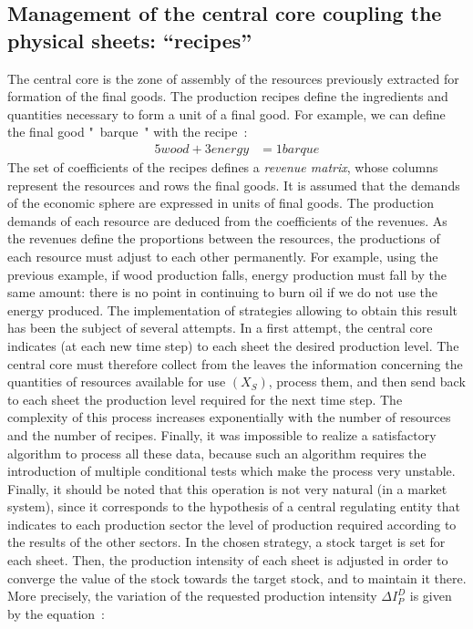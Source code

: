\documentclass[12pt,a4paper]{article}%
\begin{document}
\begin{appendix}
\section{Management of the central core coupling the physical sheets: ``recipes''}   
The central core is the zone of assembly of the resources previously extracted for formation of the final goods. The production recipes define the ingredients and quantities necessary to form a unit of a final good. For example, we can define the final good "~barque~" with the recipe~: 
\begin{align}
	5 wood + 3 energy &= 1 barque 
\end{align} 
The set of coefficients of the recipes defines a \textit{revenue matrix}, whose columns represent the resources and rows the final goods.  It is assumed that the demands of the economic sphere are expressed in units of final goods. The production demands of each resource are deduced from the coefficients of the revenues.  As the revenues define the proportions between the resources, the productions of each resource must adjust to each other permanently. For example, using the previous example, if wood production falls, energy production must fall by the same amount: there is no point in continuing to burn oil if we do not use the energy produced.  The implementation of strategies allowing to obtain this result has been the subject of several attempts. In a first attempt, the central core indicates (at each new time step) to each sheet the desired production level. The central core must therefore collect from the leaves the information concerning the quantities of resources available for use $(X_{S})$, process them, and then send back to each sheet the production level required for the next time step. The complexity of this process increases exponentially with the number of resources and the number of recipes. Finally, it was impossible to realize a satisfactory algorithm to process all these data, because such an algorithm requires the introduction of multiple conditional tests which make the process very unstable. Finally, it should be noted that this operation is not very natural (in a market system), since it corresponds to the hypothesis of a central regulating entity that indicates to each production sector the level of production required according to the results of the other sectors.  In the chosen strategy, a stock target is set for each sheet. Then, the production intensity of each sheet is adjusted in order to converge the value of the stock towards the target stock, and to maintain it there. More precisely, the variation of the requested production intensity $\Delta I_{P}^{D}$ is given by the equation~:

\end{appendix}
\end{document}
